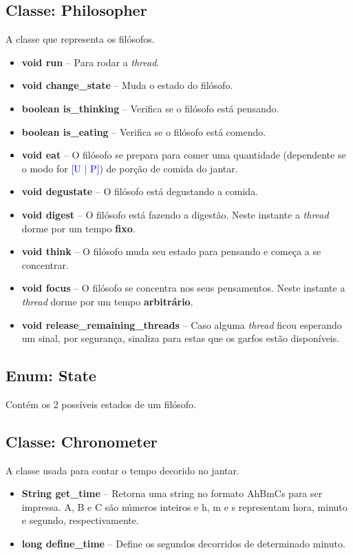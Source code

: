 \documentclass[11pt]{article}
\begin{document}
\subsection{Classe: Philosopher}
A classe que representa os filósofos. 
\begin{itemize}
	\item \textbf{\textcolor{sblue}{void} run} -- Para rodar a \textit{thread}.
	\item \textbf{\textcolor{sblue}{void} change\_state} -- Muda o estado do filósofo.
	\item \textbf{\textcolor{sblue}{boolean} is\_thinking} -- Verifica se o filósofo está pensando.
	\item \textbf{\textcolor{sblue}{boolean} is\_eating} -- Verifica se o filósofo está comendo.
	\item \textbf{\textcolor{sblue}{void} eat} -- O filósofo se prepara para comer uma quantidade (dependente se o modo for \textcolor{blue}{[U $|$ P]}) de porção de comida do jantar.
	\item \textbf{\textcolor{sblue}{void} degustate} -- O filósofo está degustando a comida.
	\item \textbf{\textcolor{sblue}{void} digest} -- O filósofo está fazendo a digestão. Neste instante a \textit{thread} dorme por um tempo \textbf{fixo}.
	\item \textbf{\textcolor{sblue}{void} think} -- O filósofo muda seu estado para pensando e começa a se concentrar.
	\item \textbf{\textcolor{sblue}{void} focus} -- O filósofo se concentra nos seus pensamentos. Neste instante a \textit{thread} dorme por um tempo \textbf{arbitrário}.
	\item \textbf{\textcolor{sblue}{void} release\_remaining\_threads} -- Caso alguma \textit{thread} ficou esperando um sinal, por segurança, sinaliza para estas que os garfos estão disponíveis.
\end{itemize}

\subsection{Enum: State}
Contém os 2 possíveis estados de um filósofo.

\subsection{Classe: Chronometer}
A classe usada para contar o tempo decorido no jantar. 
\begin{itemize}
	\item \textbf{\textcolor{sblue}{String} get\_time} -- Retorna uma string no formato AhBmCs para ser impressa. A, B e C são números inteiros e h, m e s representam hora, minuto e segundo, respectivamente.
	\item \textbf{\textcolor{sblue}{long} define\_time} -- Define os segundos decorridos de determinado minuto.
\end{itemize}
\end{document}
